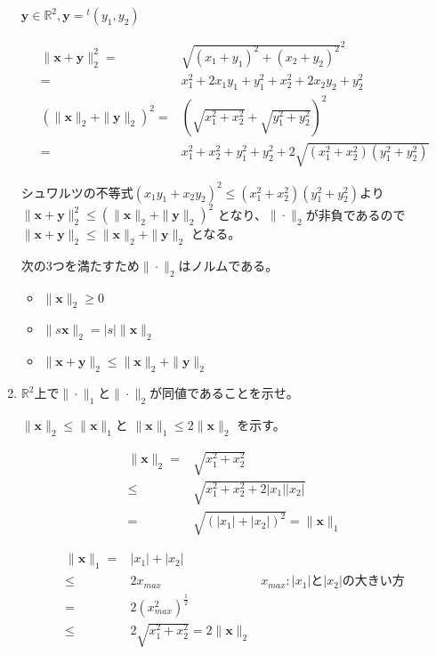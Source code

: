 \documentclass[10pt,b5paper]{ltjsarticle}
\begin{document}
\begin{enumerate}
      $\bm{y}\in\mathbb{R}^2, \bm{y}={}^{t}(y_1, y_2)$

      \begin{align}
       \| \bm{x}+\bm{y} \|_2^2
       = & \sqrt{(x_1+y_1)^2+(x_2+y_2)^2}^2\\
       = & x_1^2+2x_1y_1+y_1^2 + x_2^2+2x_2y_2+y_2^2\\
       \left(\| \bm{x}\|_2+\|\bm{y} \|_2\right)^2
       = & \left(\sqrt{x_1^2+x_2^2}+\sqrt{y_1^2+y_2^2}\right)^2\\
       = & x_1^2+x_2^2 + y_1^2+y_2^2 + 2\sqrt{(x_1^2+x_2^2)(y_1^2+y_2^2)}
      \end{align}

      シュワルツの不等式$(x_1y_1+x_2y_2)^2 \leq (x_1^2+x_2^2)(y_1^2+y_2^2)$より
      $\| \bm{x}+\bm{y} \|_2^2 \leq \left(\| \bm{x}\|_2+\|\bm{y} \|_2\right)^2$
      となり、$\|\cdot\|_2$が非負であるので
      $\| \bm{x}+\bm{y} \|_2 \leq \| \bm{x}\|_2+\|\bm{y} \|_2$
      となる。

      次の3つを満たすため$\|\cdot\|_2$はノルムである。
      \begin{itemize}
       \item $\|\bm{x}\|_2\geq 0$
       \item $\| s\bm{x} \|_2 = \lvert s\rvert \|\bm{x}\|_2$
       \item $\| \bm{x}+\bm{y} \|_2 \leq \| \bm{x}\|_2+\|\bm{y} \|_2$
      \end{itemize}

      \hrulefill
 \item
      $\mathbb{R}^2$上で$\|\cdot\|_1$と$\|\cdot\|_2$が同値であることを示せ。

      \dotfill

      $\| \bm{x} \|_2 \leq \| \bm{x}\|_1$と
      $\| \bm{x} \|_1 \leq 2 \| \bm{x}\|_2$
      を示す。

      \begin{align}
       \| \bm{x}\|_2 = & \sqrt{x_1^2+x_2^2}\\
       \leq & \sqrt{x_1^2+x_2^2 + 2\lvert x_1 \rvert \lvert x_2 \rvert}\\
       = & \sqrt{(\lvert x_1 \rvert + \lvert x_2 \rvert)^2}
       = \| \bm{x}\|_1
      \end{align}

      \begin{align}
       \| \bm{x}\|_1 =& \lvert x_1 \rvert + \lvert x_2 \rvert\\
       \leq & 2 x_{max} & x_{max} : \lvert x_1\rvert と \lvert x_2\rvert の大きい方\\
       = & 2 (x_{max}^2)^{\frac{1}{2}}\\
       \leq & 2 \sqrt{x_1^2+x_2^2}
       = 2 \| \bm{x}\|_2
      \end{align}


\end{enumerate}
\end{document}
